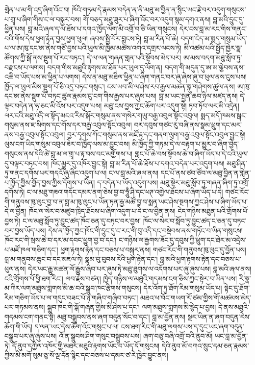 \documentclass{article}
\begin{document}
གླེན་པ་མ་གི་འདྲ་ཞིག་འོང་བ། ཁོའི་གཏམ་དེ་རྣམས་བདེན་ན་ནི་མཐུ་མ་བྱིན་ན་སྙིང་ཡང་རྗེ་བར་འདུག་གསུངས་པ་གྲྭ་པ་ཞིག་གིས་ང་ལ་བསྐྱར་བས། གོ་བཅད་མཐུ་ཟུར་པ་ཞིག་འོང་བར་འདུག་སྙམ་དགའ་ནས། བླ་མའི་དྲུང་དུ་ཕྱིན་པས། བླ་མའི་ཞལ་ད་ལ་ཐོས་པ་དགའ་ཁྱོད་ལོག་མི་འགྲོ་བ་ཅི་ཡིན་གསུངས། དེར་ངས་བླ་མ་རང་གིས་གནང་བའི་གོས་དེས་ཕྱག་རྟེན་བྱས་ཕྱག་ཕུལ། ཞབས་སྤྱི་བོར་བླངས་ཏེ། བླ་མ་རིན་པོ་ཆེ། བདག་ངེད་མ་སྨད་གསུམ་ཡོད་པ་ལ་ཨ་ཁུ་དང་ཨ་ནེས་གཙོ་བྱས་པའི་ཡུལ་མི་ཁྱིམ་མཚེས་འགའ་དགྲར་ལངས་ཏེ། མི་འཚམ་པའི་སྤྱོད་ཁྱེར་སྣ་ཚོགས་ཀྱི་སྒོ་ནས་སྡུག་པོ་རང་བཏང་། དེ་ལ་ལན་གཞན་གླན་པའི་སྟོབས་མེད་པར། ཨ་མས་བདག་མཐུ་སློབ་ཏུ་བརྫངས་པ་ལགས། བདག་གིས་མཐུའི་རྟགས་མ་ཐོན་པར་ཡུལ་དུ་ལོག་ན། བདག་གི་མདུན་དུ་ཨ་མ་ལྕེབས་ནས་འཆི་བ་ཡོད་པས་མ་ཕྱིན་པ་ལགས། དེས་ན་མཐུ་མཐིལ་ཕྱིན་པ་ཞིག་གནང་བར་ཞུ་ཞེས་ཞུ་བ་ཕུལ་ནས་ངུས་པས། ཁྱོད་ལ་ཡུལ་མིས་སྡུག་པོ་ཅི་འདྲ་བཏང་གསུང་། ངས་ཡབ་མི་ལ་ཤེས་རབ་རྒྱལ་མཚན་སྐུ་གཤེགས་ཚུལ་ནས། ཨ་ཁུ་དང་ཨ་ནེས་སྡུག་པོ་བཏང་ཚུལ་རྣམས་ངུ་ངག་གིས་རྒྱས་པར་ཞུས་པས། བླ་མ་ཡང་སྤྱན་ཆབ་ཉིལ་མཛད་ནས། དེ་ལྟར་བདེན་ན་ཧ་ཅང་མི་འོས་པར་འདུག་པས། མཐུ་ངས་བྱས་ཀྱང་ཆོག་པར་འདུག་སྟེ། ཏབ་ཏོབ་ལར་མི་འདྲེན། ལར་ངའི་མཐུ་འདི་ལ་སྟོད་མངའ་རིས་སྐོར་གསུམ་ནས་གསེར་གཡུ་བརྒྱ་འབུལ་སྟོང་འབུལ། སྨད་མདོ་ཁམས་སྒང་གསུམ་ནས་ཇ་སིགས་དང་གོས་དར་བརྒྱ་འབུལ་སྟོང་འབུལ། བར་དབུས་གཙང་རུ་བཞི་ནས་སྣམ་ཕྲུག་དང་མར་ནས་བརྒྱ་འབུལ་སྟོང་འབུལ། བྱར་དྭགས་ཀོང་གསུམ་ནས་མཛོ་རྟ་དང་གནག་ལུག་བརྒྱ་འབུལ་སྟོང་འབུལ་བྱུང་སྟེ། ལུས་ངག་ཡིད་གསུམ་འབུལ་ཟེར་བ་ཁྱོད་ལས་མ་བྱུང་བས། མི་ཁྱོད་ཀྱི་གཏམ་དེ་ལ་བརྟག་པ་མྱུར་བ་ཞིག་བྱེད་གསུངས་ནས་དེའི་ཚེ་བླ་མ་ལ་གྲྭ་པ་རྟ་བས་བང་མགྱོགས་པ། གླང་པོ་ཆེ་བས་སྟོབས་ཆེ་བ་ཞིག་ཡོད་པ་དེ་ངའི་ཡུལ་དུ་བལྟར་བཏང་བས། ཁོང་མྱུར་དུ་འཁོར་བྱུང་སྟེ། བླ་མ་རིན་པོ་ཆེ་ཐོས་པ་དགའ་བདེན་པར་འདུག་པས། མཐུ་ཤིན་ཏུ་གནང་དགོས་པར་གདའོ་ཞུ་ཞིང་འདུག་པ་ལ། ང་ལ་བླ་མའི་ཞལ་ནས། དང་པོ་ནས་ཙབ་ཙོབ་ལ་མཐུ་བྱིན་ན་གླེན་པ་ཁྱོད་ཀྱིས་གྱོད་བྱས་ཀྱིས་དོགས་པ་ཡིན། ད་བདེན་པ་ཡོད་འདུག་པས། མཐུ་སྟེར་མཐུ་སློབ་ཏུ་གཞན་ཞིག་ཏུ་འགྲོ་དགོས་ཏེ། ང་ལ་མཐུ་གཟའ་གདོང་དམར་ནག་ཅེས་བྱ་བ་ཧཱུྃ་ཤི་དང་ཕཊ་འགྱེལ་ཐོངས་པ་ཞིག་ཡོད་པ་དེ། གཙང་རོང་གི་གནུབས་ཁུ་ལུང་བྱ་བ་ན་བླ་མ་ཁུ་ལུང་པ་ཡོན་ཏན་རྒྱ་མཚོ་བྱ་བ་སྨན་ཡང་ཤེས་སྔགས་ཀྱང་ཤེས་པ་ཞིག་ཡོད་པ་དེ་ལ་བྱིན། ཁོང་ལ་སེར་བ་མཛུབ་ཁྲིད་ཐོངས་པ་ཞིག་འདུག་པ་དེ་ང་ལ་བྱིན་ནས། ངེད་གཉིས་མཐུན་པའི་གྲོགས་པོ་བྱས་ཏེ། ང་ལ་མཐུ་སློབ་ཏུ་བྱུང་ཚད་ཁོང་ཅན་དུ་བཏང་བར་བྱས། ཁོང་ལ་སེར་བ་སློབ་ཏུ་བྱུང་ཚད་ང་ཅན་དུ་བཏང་བར་བྱས་ཡོད་པས། དེས་ན་ཁྱོད་ཀྱང་ཁོང་གི་དྲུང་དུ་ང་རང་གི་བུ་འདི་དང་བསྡེབས་ནས་གཏོང་བ་ཡིན་གསུངས། ཁོང་རང་གི་སྲས་ཆེ་བ་དར་མ་དབང་ཕྱུག་བྱ་བ་དང་། ང་གཉིས་ལ་རྒྱགས་ཟོང་དུ་དབུས་ཀྱི་ཕྲུག་དང་ཐེར་མ་འདྲེས་པ་མཛོ་ཁལ་གཅིག་དང་། ཕྱག་རྟགས་རྟེན་དང་བཅས་པ་བསྐུར་ནས། གཙང་རོང་གི་གནུབས་ཁུ་ལུང་དུ་བྱོན་པས། བླ་མ་གནུབས་ཆུང་བ་དང་མཇལ་ཏེ། སྣམ་བུ་བུབས་རེའི་ཕྱག་རྟེན་དང་། བླ་མའི་ཕྱག་རྟགས་རྟེན་དང་བཅས་པ་ཕུལ་ནས། དེར་ཡང་རྒྱུ་མཚན་ལོ་རྒྱུས་ཞིབ་པར་ཞུས་ཏེ་མཐུ་ཐུགས་ལ་འདོགས་པར་ཞུ་ཞུས་པས། བླ་མའི་ཞལ་ནས། ངའི་གྲོགས་པོ་ཕྱི་ཐག་རིང་། ལབ་རྗེས་བཙན། ཁྱེད་གཉིས་ལ་མཐུའི་གདམས་ངག་ཅིས་ཀྱང་སྟེར་བ་ཡིན་པས། རི་སྣ་མ་ཀིར་ལག་མཐུས་གླགས་མི་ཆ་བའི་སྒྲུབ་ཁང་རྩིགས་གསུངས། དེར་འོག་ཏུ་ཐོག་རིམ་གསུམ་ཡོད་པ། སྟེང་དུ་ཐོག་རིམ་གཅིག་ཡོད་པ་ལ་གདུང་བཟང་པོ་ཉ་གཞིབ་གཞིབ་བཏང་། མཐའ་ཕ་བོང་གཡག་རོ་ཙམ་གྱིས་གོ་མཚམས་མེད་པར་གཏམས་ནས། སྒྲུབ་ཁང་གི་སྒོ་གཞན་གྱིས་མི་ཤེས་པ་དང་། ལག་མཐུས་གླགས་མི་རྙེད་པ་བྱས། དེ་ནས་མཐུའི་གདམས་ངག་གནང་སྟེ། མཐུ་བསྒྲུབས་ནས་ཞག་བདུན་སོང་བ་དང་། བླ་མ་བྱོན་ནས། སྔར་ཡིན་ན་ཞག་བདུན་རེས་ཆོག་གི་ཡོད། ད་ལན་ཡང་དེས་ཆོག་འོང་གསུང་པ་ལ། ངས་ཐག་རིང་གི་མཐུ་ལགས་པས་ད་དུང་ཡང་ཞག་བདུན་བསྒྲུབ་པར་ཞུ་ཞུས་པས། འོ་ན་སྒྲུབས་ཤིག་གསུང་བསྒྲུབས་པས། ཞག་བཅུ་བཞི་འགྲོ་བའི་ནུབ་མོ། ཡང་བླ་མ་བྱོན་ཏེ། དོ་ནུབ་དཀྱིལ་འཁོར་གྱི་མཐར་མཐུའི་རྟགས་ཡོང་བ་ཡོད་དོ་གསུངས། དེའི་ནུབ་མོ་བཀའ་སྲུང་དམ་ཅན་རྣམས་ཀྱིས་མི་མགོ་སུམ་ཅུ་སོ་ལྔ་དོན་སྙིང་དང་བཅས་པ་དམར་ཙ་རེ་ཁྱེར་བྱུང་ནས། 
\end{document}
